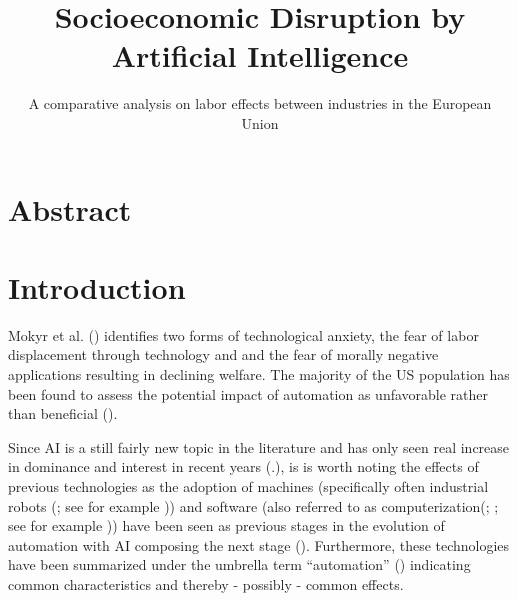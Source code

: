 \documentclass[
  11,
  a4paperpaper,
]{article}
\title{Socioeconomic Disruption by Artificial Intelligence}
\subtitle{A comparative analysis on labor effects between industries in
the European Union}
\author{}
\date{}
\let\oldsection\section
\renewcommand\section{\clearpage\oldsection}
\begin{document}
\maketitle
{}

\newpage{}

\tableofcontents

\newpage{}

\listoffigures

\newpage{}

\listoftables

\newpage{}


\section{Abstract}\label{abstract}

\section{Introduction}\label{sec-introduction}

Mokyr et al. () identifies
two forms of technological anxiety, the fear of labor displacement
through technology and and the fear of morally negative applications
resulting in declining welfare. The majority of the US population has
been found to assess the potential impact of automation as unfavorable
rather than beneficial
().

Since AI is a still fairly new topic in the literature and has only seen
real increase in dominance and interest in recent years
(.), is
is worth noting the effects of previous technologies as the adoption of
machines (specifically often industrial robots
(; see
for example )) and software (also referred to as
computerization(;
; see for example
))
have been seen as previous stages in the evolution of automation with AI
composing the next stage (). Furthermore, these technologies have been summarized
under the umbrella term ``automation''
()
indicating common characteristics and thereby - possibly - common
effects.
\end{document}
